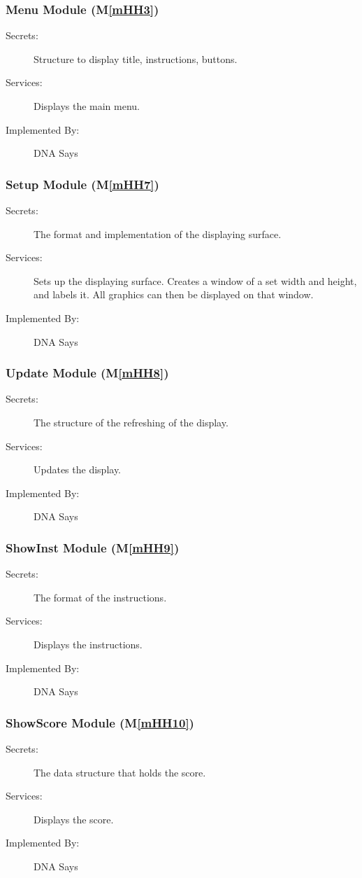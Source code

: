 \documentclass[12pt, titlepage]{article}
\newcommand{\mref}[1]{M\ref{#1}}
\begin{document}
\subsubsection{Menu Module (\mref{mHH3})}
\begin{description}
\item[Secrets:]Structure to display title, instructions, buttons. 
\item[Services:]Displays the main menu.
\item[Implemented By:] DNA Says
\end{description}

\subsubsection{Setup Module (\mref{mHH7})}
\begin{description}
\item[Secrets:]The format and implementation of the displaying surface.
\item[Services:]Sets up the displaying surface. Creates a window of a set width and height, and labels it. All graphics can then be displayed on that window.
\item[Implemented By:] DNA Says
\end{description}

\subsubsection{Update Module (\mref{mHH8})}
\begin{description}
\item[Secrets:]The structure of the refreshing of the display.
\item[Services:]Updates the display.
\item[Implemented By:] DNA Says
\end{description}

\subsubsection{ShowInst Module (\mref{mHH9})}
\begin{description}
\item[Secrets:]The format of the instructions.
\item[Services:]Displays the instructions.
\item[Implemented By:] DNA Says
\end{description}

\subsubsection{ShowScore Module (\mref{mHH10})}
\begin{description}
\item[Secrets:]The data structure that holds the score.
\item[Services:]Displays the score.
\item[Implemented By:] DNA Says
\end{description}
\end{document}
